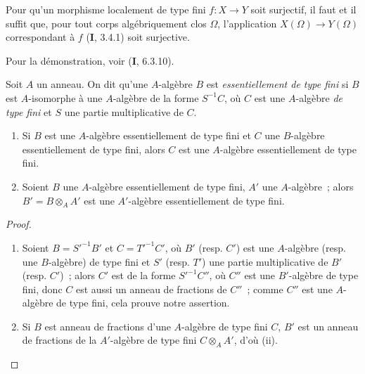 \begin{proposition}[1.3.7]
\label{IV.1.3.7-fr}
Pour qu'un morphisme localement de type fini $f:X\to Y$ soit surjectif, il
faut et il suffit que, pour tout corps algébriquement clos $\Omega$,
l'application $X(\Omega)\to Y(\Omega)$ correspondant à $f$ \textup{(\textbf{I}, 3.4.1)} soit
surjective.
\end{proposition}

Pour la démonstration, voir (\textbf{I}, 6.3.10).

\begin{env}[1.3.8]
\label{IV.1.3.8-fr}
Soit $A$ un anneau. On dit qu'une $A$-algèbre $B$ est \emph{essentiellement de
type fini} si $B$ est $A$-isomorphe à une $A$-algèbre de la forme $S^{-1}C$,
où $C$ est une $A$-algèbre \emph{de type fini} et $S$ une partie multiplicative
de $C$.
\end{env}

\par\medskip\noindent
\begin{proposition}[1.3.9]
\label{IV.1.3.9-fr}
\begin{enumerate}
  \item[\textup{(i)}] Si $B$ est une $A$-algèbre essentiellement de type fini et $C$
  une $B$-algèbre essentiellement de type fini, alors $C$ est une
  $A$-algèbre essentiellement de type fini.
  \item[\textup{(ii)}] Soient $B$ une $A$-algèbre essentiellement de type fini, $A'$
  une $A$-algèbre~; alors $B'=B\otimes_AA'$ est une $A'$-algèbre
  essentiellement de type fini.
\end{enumerate}
\end{proposition}

\begin{proof}
\begin{enumerate}
  \item[(i)] Soient $B=S'^{-1}B'$ et $C=T'^{-1}C'$, où $B'$ (resp. $C'$) est
  une $A$-algèbre (resp. une $B$-algèbre) de type fini et $S'$ (resp. $T'$)
  une partie multiplicative de $B'$ (resp. $C'$)~; alors $C'$ est de la forme
  $S'^{-1}C''$, où $C''$ est une $B'$-algèbre de type fini, donc $C$ est aussi
  un anneau de fractions de $C''$~; comme $C''$ est une $A$-algèbre de type
  fini, cela prouve notre assertion.
  \item[(ii)] Si $B$ est anneau de fractions d'une $A$-algèbre de type fini
  $C$, $B'$ est un anneau de fractions de la $A'$-algèbre de type fini
  $C\otimes_AA'$, d'où (ii).
\end{enumerate}
\end{proof}

